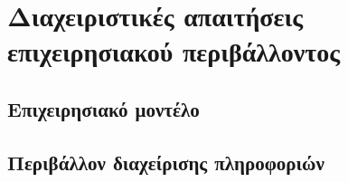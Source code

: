 \section{Διαχειριστικές απαιτήσεις επιχειρησιακού περιβάλλοντος}

\subsection{Επιχειρησιακό μοντέλο}

\subsection{Περιβάλλον διαχείρισης πληροφοριών}

